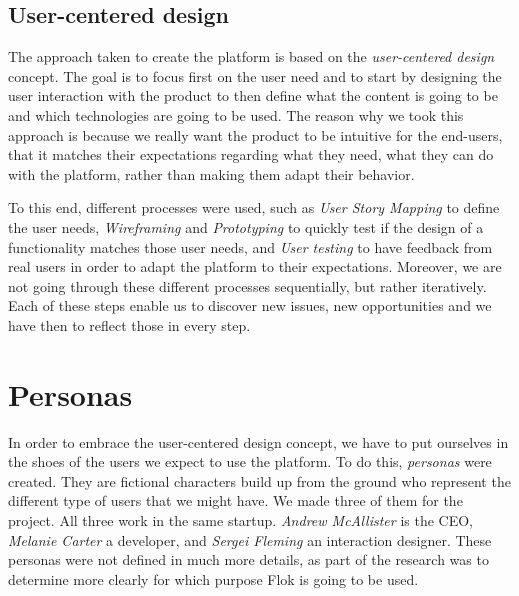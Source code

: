 \documentclass[a4paper,12pt, oneside]{article}
\begin{document}
\subsection{User-centered design}
The approach taken to create the platform is based on the \emph{user-centered design} concept.
The goal is to focus first on the user need and to start by designing the user interaction with the product to then define what the content is going to be and which technologies are going to be used.
The reason why we took this approach is because we really want the product to be intuitive for the end-users, that it matches their expectations regarding what they need, what they can do with the platform, rather than making them adapt their behavior.

To this end, different processes were used, such as \emph{User Story Mapping} to define the user needs, \emph{Wireframing} and \emph{Prototyping} to quickly test if the design of a functionality matches those user needs, and \emph{User testing} to have feedback from real users in order to adapt the platform to their expectations.
Moreover, we are not going through these different processes sequentially, but rather iteratively.
Each of these steps enable us to discover new issues, new opportunities and we have then to reflect those in every step.


\section{Personas}
In order to embrace the user-centered design concept, we have to put ourselves in the shoes of the users we expect to use the platform. To do this, \emph{personas} were created.
They are fictional characters build up from the ground who represent the different type of users that we might have.
We made three of them for the project.
All three work in the same startup. \emph{Andrew McAllister} is the CEO, \emph{Melanie Carter} a developer, and \emph{Sergei Fleming} an interaction designer.
These personas were not defined in much more details, as part of the research was to determine more clearly for which purpose Flok is going to be used.
\end{document}
